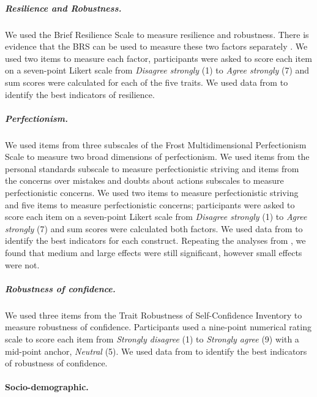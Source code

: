 \documentclass[
  12pt,
  a4paper,
]{book}
\begin{document}
\hypertarget{resilience-and-robustness.}{%
\subparagraph{Resilience and Robustness.}\label{resilience-and-robustness.}}

We used the Brief Resilience Scale \citep[BRS;][]{Smith2008} to measure resilience and robustness. There is evidence that the BRS can be used to measure these two factors separately \citep{Hardy2019c}. We used two items to measure each factor, participants were asked to score each item on a seven-point Likert scale from \emph{Disagree strongly} (1) to \emph{Agree strongly} (7) and sum scores were calculated for each of the five traits. We used data from \citet{Hardy2019c} to identify the best indicators of resilience.

\hypertarget{perfectionism.}{%
\subparagraph{Perfectionism.}\label{perfectionism.}}

We used items from three subscales of the Frost Multidimensional Perfectionism Scale \citep[FMPS;][]{Frost1990} to measure two broad dimensions of perfectionism. We used items from the personal standards subscale to measure perfectionistic striving and items from the concerns over mistakes and doubts about actions subscales to measure perfectionistic concerns. We used two items to measure perfectionistic striving and five items to measure perfectionistic concerns; participants were asked to score each item on a seven-point Likert scale from \emph{Disagree strongly} (1) to \emph{Agree strongly} (7) and sum scores were calculated both factors. We used data from \citet{Roberts2013} to identify the best indicators for each construct. Repeating the analyses from \citet{Roberts2013}, we found that medium and large effects were still significant, however small effects were not.

\hypertarget{robustness-of-confidence.}{%
\subparagraph{Robustness of confidence.}\label{robustness-of-confidence.}}

We used three items from the Trait Robustness of Self-Confidence Inventory \citep[TROSCI;][]{Beattie2011} to measure robustness of confidence. Participants used a nine-point numerical rating scale to score each item from \emph{Strongly disagree} (1) to \emph{Strongly agree} (9) with a mid-point anchor, \emph{Neutral} (5). We used data from \citet{Beattie2011} to identify the best indicators of robustness of confidence.

\hypertarget{socio-demographic.}{%
\paragraph{Socio-demographic.}\label{socio-demographic.}}
\end{document}
